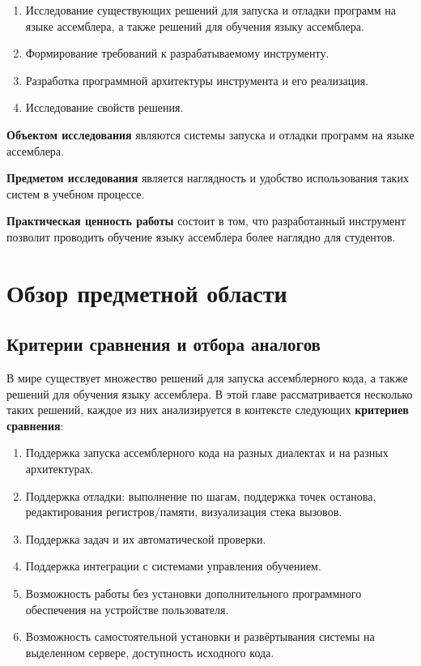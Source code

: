 \documentclass[a4paper,article,14pt]{extarticle}
\begin{document}
\begin{enumerate}
    \item Исследование существующих решений для запуска и отладки программ на языке ассемблера, а также решений для обучения языку ассемблера.
    \item Формирование требований к разрабатываемому инструменту.
    \item Разработка программной архитектуры инструмента и его реализация.
    \item Исследование свойств решения.
\end{enumerate}

\textbf{Объектом исследования} являются системы запуска и отладки программ на языке ассемблера.

\textbf{Предметом исследования} является наглядность и удобство использования таких систем в учебном процессе.

\textbf{Практическая ценность работы} состоит в том, что разработанный инструмент позволит проводить обучение языку ассемблера более наглядно для студентов.

\pagebreak
\section{Обзор предметной области}
\subsection{Критерии сравнения и отбора аналогов}

В мире существует множество решений для запуска ассемблерного кода, а также решений для обучения языку ассемблера. В этой главе рассматривается несколько таких решений, каждое из них анализируется в контексте следующих \textbf{критериев сравнения}:

\begin{enumerate}
    \item Поддержка запуска ассемблерного кода на разных диалектах и на разных архитектурах.
    \item Поддержка отладки: выполнение по шагам, поддержка точек останова, редактирования регистров/памяти, визуализация стека вызовов.
    \item Поддержка задач и их автоматической проверки.
    \item Поддержка интеграции с системами управления обучением.
    \item Возможность работы без установки дополнительного программного обеспечения на устройстве пользователя.
    \item Возможность самостоятельной установки и развёртывания системы на выделенном сервере, доступность исходного кода.
\end{enumerate}
\end{document}
